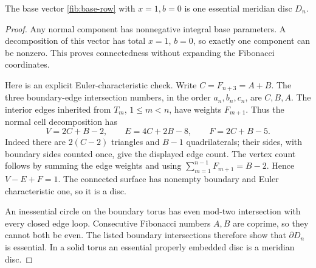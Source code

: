 \begin{lemma}
\label{fib:meridian}
The base vector \eqref{fib:base-row} with \(x=1,b=0\) is one essential
meridian disc \(D_n\).
\end{lemma}
\begin{proof}
Any normal component has nonnegative integral base parameters.  A
decomposition of this vector has total \(x=1\), \(b=0\), so exactly
one component can be nonzero.  This proves connectedness without expanding
the Fibonacci coordinates.

Here is an explicit Euler-characteristic check.  Write
\(C=F_{n+3}=A+B\).  The three boundary-edge intersection numbers, in
the order \(a_n,b_n,c_n\), are \(C,B,A\).
The interior edges inherited from \(T_m\), \(1\leq m<n\), have
weights \(F_{m+1}\).  Thus the normal cell decomposition has
\[
 V=2C+B-2,\qquad E=4C+2B-8,\qquad F=2C+B-5.
\]
Indeed there are \(2(C-2)\) triangles and \(B-1\) quadrilaterals;
their sides, with boundary sides counted once, give the displayed edge
count.  The vertex count follows by summing the edge weights and using
\(\sum_{m=1}^{n-1}F_{m+1}=B-2\).  Hence \(V-E+F=1\).
The connected surface has nonempty boundary and Euler characteristic one,
so it is a disc.

An inessential circle on the boundary torus has even mod-two intersection
with every closed edge loop.  Consecutive Fibonacci numbers \(A,B\)
are coprime, so they cannot both be even.  The listed boundary intersections
therefore show that \(\partial D_n\) is essential.  In a solid torus
an essential properly embedded disc is a meridian disc.
\end{proof}

